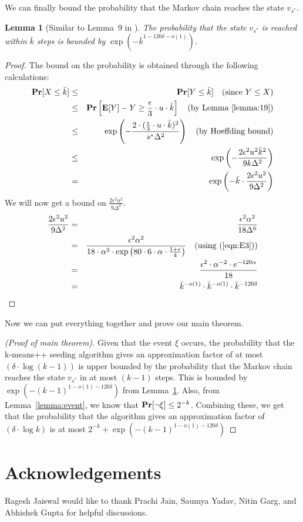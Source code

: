 \documentclass[11pt]{article}
\newtheorem{lemma}[theorem]{Lemma}
\newcommand{\pr}{{\bf Pr}}
\newcommand{\ex}{{\bf E}}
\newcommand{\eps}{{\epsilon}}
\begin{document}
We can finally bound the probability that the Markov chain reaches the state $v_{s^*}$.

\begin{lemma}[Similar to Lemma~9 in \cite{br12}]\label{lemma:20}
The probability that the state $v_{s^*}$ is reached within $\bar{k}$ steps is bounded by $\exp(-\bar{k}^{1 - 120\delta - o(1)})$.
\end{lemma}
\begin{proof}
The bound on the probability is obtained through the following calculations:
\begin{eqnarray*}
\pr[X \leq \bar{k}] &\leq& \pr[Y \leq \bar{k}] \quad \textrm{(since $Y \leq X$)} \\
&\leq& \pr\left[\ex[Y] - Y \geq \frac{\eps}{3} \cdot u \cdot \bar{k}\right] \quad \textrm{(by Lemma~\ref{lemma:19})} \\
&\leq& \exp\left( - \frac{2 \cdot (\frac{\eps}{3} \cdot u \cdot \bar{k})^2}{s^* \Delta^2} \right) \quad \textrm{(by Hoeffding bound)}\\
&\leq& \exp\left( - \frac{2 \eps^2u^2\bar{k}^2}{9 k \Delta^2} \right) \\
&=& \exp\left( - \bar{k} \cdot \frac{2 \eps^2u^2}{9 \Delta^2} \right)
\end{eqnarray*}
We will now get a bound on $\frac{2 \eps^2 u^2}{9 \Delta^2}$.
\begin{eqnarray*}
\frac{2 \eps^2 u^2}{9 \Delta^2} &=& \frac{\eps^2 \alpha^2}{18 \Delta^6} \\
&=& \frac{\eps^2 \alpha^2}{18 \cdot \alpha^3 \cdot \exp\left(80 \cdot 6 \cdot \alpha \cdot \frac{1 + \eps}{4}\right)} \quad \textrm{(using (\ref{eqn:E3}))}\\
&=& \frac{\eps^2 \cdot \alpha^{-2} \cdot e^{-120\alpha}}{18} \\
&=& \bar{k}^{-o(1)} \cdot \bar{k}^{-o(1)} \cdot \bar{k}^{-120 \delta}
\end{eqnarray*}
\end{proof}

Now we can put everything together and prove our main theorem.

\begin{proof}[(Proof of main theorem)]
Given that the event $\xi$ occurs, the probability that the k-means++ seeding algorithm gives an approximation factor of at most $(\delta \cdot \log{(k-1)})$ is upper bounded by the probability that the Markov chain reaches the state $v_{s^*}$ in at most $(k-1)$ steps. 
This is bounded by $\exp(-(k-1)^{1 - o(1) - 120 \delta})$ from Lemma~\ref{lemma:20}.
Also, from Lemma~\ref{lemma:event}, we know that $\pr[\neg \xi] \leq 2^{-k}$.
Combining these, we get that the probability that the algorithm gives an approximation factor of $(\delta \cdot \log{k})$ is at most $2^{-k} + \exp(-(k-1)^{1 - o(1) - 120 \delta})$
\end{proof}

\section{Acknowledgements}
Ragesh Jaiswal would like to thank Prachi Jain, Saumya Yadav, Nitin Garg, and Abhishek Gupta for helpful discussions.



\end{document}

